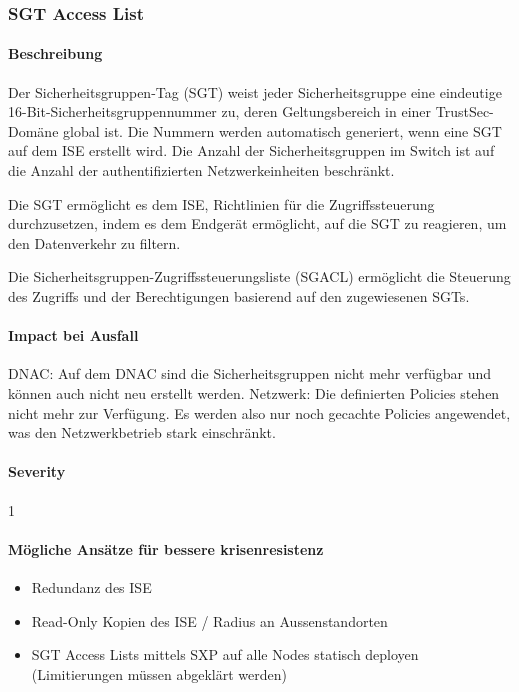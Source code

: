 \subsubsection{SGT Access List}
\paragraph{Beschreibung}
Der Sicherheitsgruppen-Tag (SGT) weist jeder Sicherheitsgruppe eine eindeutige 16-Bit-Sicherheitsgruppennummer zu, deren Geltungsbereich in einer TrustSec-Domäne global ist. Die Nummern werden automatisch generiert, wenn eine SGT auf dem ISE erstellt wird. Die Anzahl der Sicherheitsgruppen im Switch ist auf die Anzahl der authentifizierten Netzwerkeinheiten beschränkt.

Die SGT ermöglicht es dem ISE, Richtlinien für die Zugriffssteuerung durchzusetzen, indem es dem Endgerät ermöglicht, auf die SGT zu reagieren, um den Datenverkehr zu filtern.

Die Sicherheitsgruppen-Zugriffssteuerungsliste (SGACL) ermöglicht die Steuerung des Zugriffs und der Berechtigungen basierend auf den zugewiesenen SGTs.

\paragraph{Impact bei Ausfall}
DNAC: Auf dem DNAC sind die Sicherheitsgruppen nicht mehr verfügbar und können auch nicht neu erstellt werden.
Netzwerk: Die definierten Policies stehen nicht mehr zur Verfügung. Es werden also nur noch gecachte Policies angewendet, was den Netzwerkbetrieb stark einschränkt. 

\paragraph{Severity} 1

\paragraph{Mögliche Ansätze für bessere krisenresistenz}
\begin{itemize}
	\item Redundanz des ISE
	\item Read-Only Kopien des ISE / Radius an Aussenstandorten
	\item SGT Access Lists mittels SXP auf alle Nodes statisch deployen (Limitierungen müssen abgeklärt werden)
\end{itemize}


